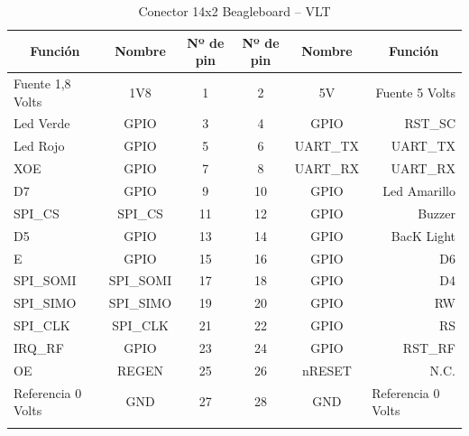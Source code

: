 \begin{longtable}{|l|c|c|c|c|r|}
\hline
\multicolumn{1}{|c|}{\textbf{Función}} & \textbf{Nombre} & \textbf{Nº de pin} & \textbf{Nº de pin} & \textbf{Nombre} & \multicolumn{1}{c|}{\textbf{Función}} \\ \hline
Fuente 1,8 Volts & 1V8 & 1 & 2 & 5V & Fuente 5 Volts \\ \hline
Led Verde & GPIO & 3 & 4 & GPIO & RST\_SC \\ \hline
Led Rojo & GPIO & 5 & 6 & UART\_TX & UART\_TX \\ \hline
XOE & GPIO & 7 & 8 & UART\_RX & UART\_RX \\ \hline
D7 & GPIO & 9 & 10 & GPIO & Led Amarillo \\ \hline
SPI\_CS & SPI\_CS & 11 & 12 & GPIO & Buzzer \\ \hline
D5 & GPIO & 13 & 14 & GPIO & BacK Light \\ \hline
E & GPIO & 15 & 16 & GPIO & D6 \\ \hline
SPI\_SOMI & SPI\_SOMI & 17 & 18 & GPIO & D4 \\ \hline
SPI\_SIMO & SPI\_SIMO & 19 & 20 & GPIO & RW \\ \hline
SPI\_CLK & SPI\_CLK & 21 & 22 & GPIO & RS \\ \hline
IRQ\_RF & GPIO & 23 & 24 & GPIO & RST\_RF \\ \hline
OE & REGEN & 25 & 26 & nRESET & N.C. \\ \hline
Referencia 0 Volts & GND & 27 & 28 & GND & \multicolumn{1}{l|}{Referencia 0 Volts} \\ \hline
\caption{Conector 14x2 Beagleboard – VLT}\label{c_VLT}
\end{longtable}


